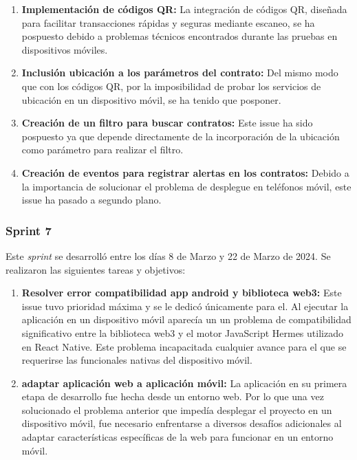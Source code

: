 \begin{enumerate}

\item \textbf{Implementación de códigos QR:} La integración de códigos QR, diseñada para facilitar transacciones rápidas y seguras mediante escaneo, se ha pospuesto debido a problemas técnicos encontrados durante las pruebas en dispositivos móviles.

\item \textbf{Inclusión ubicación a los parámetros del contrato:} Del mismo modo que con los códigos QR, por la imposibilidad de probar los servicios de ubicación en un dispositivo móvil, se ha tenido que posponer.

\item \textbf{Creación de un filtro para buscar contratos:}  Este issue ha sido pospuesto ya que depende directamente de la incorporación de la ubicación como parámetro para realizar el filtro.

\item \textbf{Creación de eventos para registrar alertas en los contratos:} Debido a la importancia de solucionar el problema de desplegue en teléfonos móvil, este issue ha pasado a segundo plano.

\end{enumerate}


\subsubsection{Sprint 7}

Este \textit{sprint} se desarrolló entre los días 8 de Marzo y 22 de Marzo de 2024. Se realizaron las siguientes tareas y objetivos:

\begin{enumerate}

\item \textbf{Resolver error compatibilidad app android y biblioteca web3:} Este issue tuvo prioridad máxima y se le dedicó únicamente para el. Al ejecutar la aplicación en un dispositivo móvil aparecía un un problema de compatibilidad significativo entre la biblioteca web3 y el motor JavaScript Hermes utilizado en React Native.
Este problema incapacitada cualquier avance para el que se requerirse las funcionales nativas del dispositivo móvil.

\item \textbf{adaptar aplicación web a aplicación móvil:} La aplicación en su primera etapa de desarrollo fue hecha desde un entorno web. Por lo que una vez solucionado el problema anterior que impedía desplegar el proyecto en un dispositivo móvil, fue necesario enfrentarse a diversos desafíos adicionales al adaptar características específicas de la web para funcionar en un entorno móvil.

\end{enumerate}

